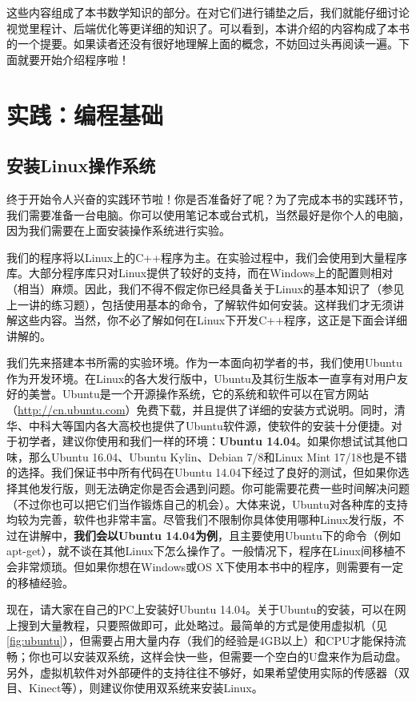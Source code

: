 这些内容组成了本书数学知识的部分。在对它们进行铺垫之后，我们就能仔细讨论视觉里程计、后端优化等更详细的知识了。可以看到，本讲介绍的内容构成了本书的一个提要。如果读者还没有很好地理解上面的概念，不妨回过头再阅读一遍。下面就要开始介绍程序啦！

\section{实践：编程基础}
\subsection{安装Linux操作系统}
终于开始令人兴奋的实践环节啦！你是否准备好了呢？为了完成本书的实践环节，我们需要准备一台电脑。你可以使用笔记本或台式机，当然最好是你个人的电脑，因为我们需要在上面安装操作系统进行实验。

我们的程序将以Linux上的C++程序为主。在实验过程中，我们会使用到大量程序库。大部分程序库只对Linux提供了较好的支持，而在Windows上的配置则相对（相当）麻烦。因此，我们不得不假定你已经具备关于Linux的基本知识了（参见上一讲的练习题），包括使用基本的命令，了解软件如何安装。这样我们才无须讲解这些内容。当然，你不必了解如何在Linux下开发C++程序，这正是下面会详细讲解的。

我们先来搭建本书所需的实验环境。作为一本面向初学者的书，我们使用Ubuntu作为开发环境。在Linux的各大发行版中，Ubuntu及其衍生版本一直享有对用户友好的美誉。Ubuntu是一个开源操作系统，它的系统和软件可以在官方网站（\url{http://cn.ubuntu.com}）免费下载，并且提供了详细的安装方式说明。同时，清华、中科大等国内各大高校也提供了Ubuntu软件源，使软件的安装十分便捷。对于初学者，建议你使用和我们一样的环境：\textbf{Ubuntu 14.04}。如果你想试试其他口味，那么Ubuntu 16.04、Ubuntu Kylin、Debian 7/8和Linux Mint 17/18也是不错的选择。我们保证书中所有代码在Ubuntu 14.04下经过了良好的测试，但如果你选择其他发行版，则无法确定你是否会遇到问题。你可能需要花费一些时间解决问题（不过你也可以把它们当作锻炼自己的机会）。大体来说，Ubuntu对各种库的支持均较为完善，软件也非常丰富。尽管我们不限制你具体使用哪种Linux发行版，不过在讲解中，\textbf{我们会以Ubuntu 14.04为例}，且主要使用Ubuntu下的命令（例如apt-get），就不谈在其他Linux下怎么操作了。一般情况下，程序在Linux间移植不会非常烦琐。但如果你想在Windows或OS X下使用本书中的程序，则需要有一定的移植经验。

现在，请大家在自己的PC上安装好Ubuntu 14.04。关于Ubuntu的安装，可以在网上搜到大量教程，只要照做即可，此处略过。最简单的方式是使用虚拟机（见\autoref{fig:ubuntu}），但需要占用大量内存（我们的经验是4GB以上）和CPU才能保持流畅；你也可以安装双系统，这样会快一些，但需要一个空白的U盘来作为启动盘。另外，虚拟机软件对外部硬件的支持往往不够好，如果希望使用实际的传感器（双目、Kinect等），则建议你使用双系统来安装Linux。

